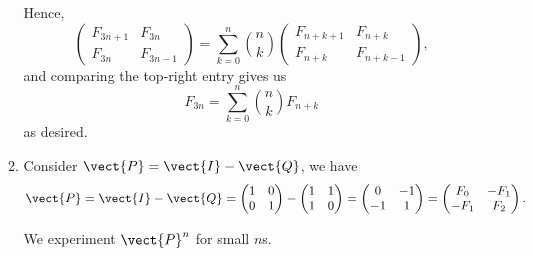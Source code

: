 \begin{enumerate}
\begin{enumerate}
                    Hence,
                    \[
                        \begin{pmatrix}
                            F_{3n + 1} & F_{3n} \\ F_{3n} & F_{3n - 1}
                        \end{pmatrix} = \sum_{k = 0}^{n} \binom{n}{k} \begin{pmatrix}
                            F_{n + k + 1} & F_{n + k} \\ F_{n + k} & F_{n + k - 1}
                        \end{pmatrix},
                    \]
                    and comparing the top-right entry gives us
                    \[
                        F_{3n} = \sum_{k = 0}^{n} \binom{n}{k} F_{n + k}
                    \]
                    as desired.

              \item Consider \(\vect{P} = \vect{I} - \vect{Q}\), we have
                    \[
                        \vect{P} = \vect{I} - \vect{Q} = \begin{pmatrix}
                            1 & 0 \\ 0 & 1
                        \end{pmatrix} - \begin{pmatrix}
                            1 & 1 \\ 1 & 0
                        \end{pmatrix} = \begin{pmatrix}
                            0 & -1 \\ -1 & 1
                        \end{pmatrix} = \begin{pmatrix}
                            F_0 & - F_1 \\ - F_1 & F_2
                        \end{pmatrix}.
                    \]

                    We experiment \(\vect{P}^n\) for small \(n\)s.


\end{enumerate}
\end{enumerate}
